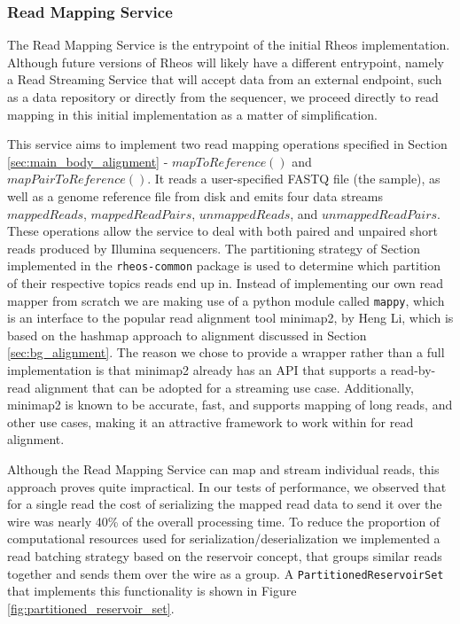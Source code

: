\subsubsection{Read Mapping Service}

The Read Mapping Service is the entrypoint of the initial Rheos implementation. Although future versions of Rheos will likely have a different entrypoint, namely a Read Streaming Service that will accept data from an external endpoint, such as a data repository or directly from the sequencer, we proceed directly to read mapping in this initial implementation as a matter of simplification. 

This service aims to implement two read mapping operations specified in Section \ref{sec:main_body_alignment} - $mapToReference()$ and $mapPairToReference()$. It reads a user-specified FASTQ file (the sample), as well as a genome reference file from disk and emits four data streams $mappedReads$, $mappedReadPairs$, $unmappedReads$, and $unmappedReadPairs$. These operations allow the service to deal with both paired and unpaired short reads produced by Illumina sequencers. The partitioning strategy of Section \label{sec:main_body_partitioning} implemented in the \texttt{rheos-common} package is used to determine which partition of their respective topics reads end up in. Instead of implementing our own read mapper from scratch we are making use of a python module called \texttt{mappy}, which is an interface to the popular read alignment tool minimap2\autocite{Li2018}, by Heng Li, which is based on the hashmap approach to alignment discussed in Section \ref{sec:bg_alignment}. The reason we chose to provide a wrapper rather than a full implementation is that minimap2 already has an API that supports a read-by-read alignment that can be adopted for a streaming use case. Additionally, minimap2 is known to be accurate, fast, and supports mapping of long reads, and other use cases, making it an attractive framework to work within for read alignment.

Although the Read Mapping Service can map and stream individual reads, this approach proves quite impractical. In our tests of performance, we observed that for a single read the cost of serializing the mapped read data to send it over the wire was nearly 40\% of the overall processing time. To reduce the proportion of computational resources used for serialization/deserialization we implemented a read batching strategy based on the reservoir concept, that groups similar reads together and sends them over the wire as a group. A \texttt{PartitionedReservoirSet} that implements this functionality is shown in Figure \ref{fig:partitioned_reservoir_set}.

